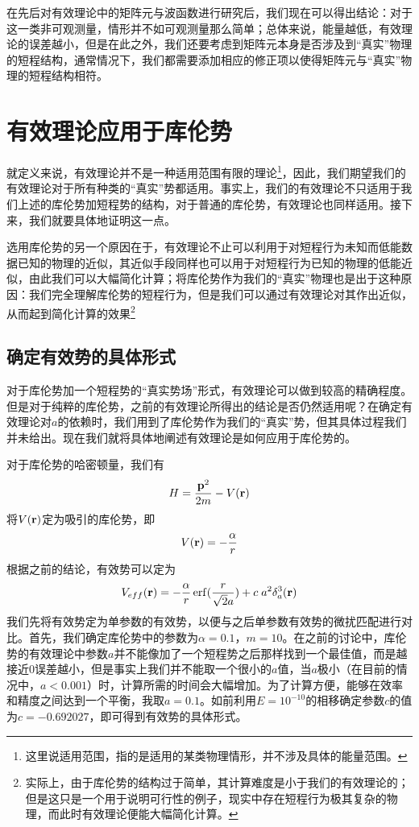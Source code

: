 \documentclass[cs4size,titlepage,twoside]{ctexart}
\begin{document}
在先后对有效理论中的矩阵元与波函数进行研究后，我们现在可以得出结论：对于这一类非可观测量，情形并不如可观测量那么简单；总体来说，能量越低，有效理论的误差越小，但是在此之外，我们还要考虑到矩阵元本身是否涉及到“真实”物理的短程结构，通常情况下，我们都需要添加相应的修正项以使得矩阵元与“真实”物理的短程结构相符。
\cleardoublepage
\section{有效理论应用于库伦势}
就定义来说，有效理论并不是一种适用范围有限的理论\footnote{这里说适用范围，指的是适用的某类物理情形，并不涉及具体的能量范围。}，因此，我们期望我们的有效理论对于所有种类的“真实”势都适用。事实上，我们的有效理论不只适用于我们上述的库伦势加短程势的结构，对于普通的库伦势，有效理论也同样适用。接下来，我们就要具体地证明这一点。

选用库伦势的另一个原因在于，有效理论不止可以利用于对短程行为未知而低能数据已知的物理的近似，其近似手段同样也可以用于对短程行为已知的物理的低能近似，由此我们可以大幅简化计算；将库伦势作为我们的“真实”物理也是出于这种原因：我们完全理解库伦势的短程行为，但是我们可以通过有效理论对其作出近似，从而起到简化计算的效果\footnote{实际上，由于库伦势的结构过于简单，其计算难度是小于我们的有效理论的；但是这只是一个用于说明可行性的例子，现实中存在短程行为极其复杂的物理，而此时有效理论便能大幅简化计算。}
\subsection{确定有效势的具体形式}
对于库伦势加一个短程势的“真实势场”形式，有效理论可以做到较高的精确程度。但是对于纯粹的库伦势，之前的有效理论所得出的结论是否仍然适用呢？在确定有效理论对$a$的依赖时，我们用到了库伦势作为我们的“真实”势，但其具体过程我们并未给出。现在我们就将具体地阐述有效理论是如何应用于库伦势的。

对于库伦势的哈密顿量，我们有
\begin{equation}\label{CoulombSmall}
	H=\frac{\vb{p}^2}{2m}-V(\vb{r})
\end{equation}
将$V(\vb{r})$定为吸引的库伦势，即
\begin{equation}
	V(\vb{r})=-\frac{\alpha}{r}
\end{equation}
根据之前的结论，有效势可以定为
\begin{equation}\label{CVeff}
	V_{eff}(\vb{r})=-\frac{\alpha}{r}\erf(\frac{r}{\sqrt{2}a})+c\;a^2\delta_a^3(\vb{r})
\end{equation}
我们先将有效势定为单参数的有效势，以便与之后单参数有效势的微扰匹配进行对比。首先，我们确定库伦势中的参数为$\alpha=0.1$，$m=10$。在之前的讨论中，库伦势的有效理论中参数$a$并不能像加了一个短程势之后那样找到一个最佳值，而是越接近0误差越小，但是事实上我们并不能取一个很小的$a$值，当$a$极小（在目前的情况中，$a<0.001$）时，计算所需的时间会大幅增加。为了计算方便，能够在效率和精度之间达到一个平衡，我取$a=0.1$。如前利用$E=10^{-10}$的相移确定参数$c$的值为$c=-0.692027$，即可得到有效势的具体形式。
\end{document}
